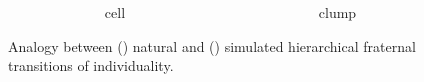 \begin{figure}
\begin{columns}
\begin{column}{0.05\textwidth}
\end{column}
\begin{column}{0.27\textwidth}
\centering
cell
\end{column}
\begin{column}{0.07\textwidth}
\end{column}
\begin{column}{0.27\textwidth}
\centering
clump
\end{column}
\end{columns}
\vspace{1ex}
\caption{Analogy between () natural and () simulated hierarchical fraternal transitions of individuality.}
\vspace{-1ex}
\end{figure}
